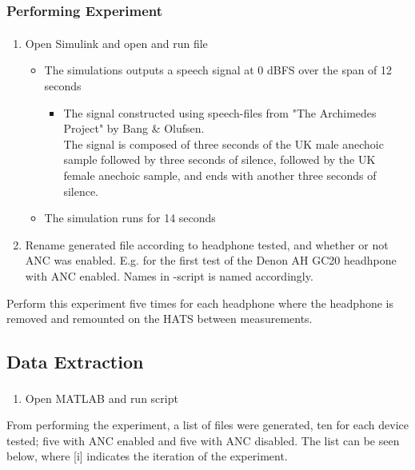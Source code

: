 	\subsubsection{Performing Experiment}
	\begin{enumerate}
		\item Open Simulink\textsuperscript{\textregistered} and open and run file 
		\begin{itemize} 
			\item The simulations outputs a speech signal at 0 dBFS over the span of 12 seconds
			\begin{itemize}
				\item [] The signal constructed using speech-files from "The Archimedes Project" by Bang \& Olufsen. \\
				The signal is composed of three seconds of the UK male anechoic sample followed by three seconds of silence, followed by the UK female anechoic sample, and ends with another three seconds of silence.
			\end{itemize}
			\item The simulation runs for 14 seconds
		\end{itemize}
		\item Rename generated file  according to headphone tested, and whether or not ANC was enabled. E.g.  for the first test of the Denon AH GC20 headhpone with ANC enabled. Names in -script is named accordingly.

	\end{enumerate}
	Perform this experiment five times for each headphone where the headphone is removed and remounted on the HATS between measurements. 
		
\subsection{Data Extraction}
\begin{enumerate}
	\item Open MATLAB\textsuperscript{\textregistered} and run script 
\end{enumerate}

From performing the experiment, a list of files were generated, ten for each device tested; five with ANC enabled and five with ANC disabled. The list can be seen below, where [i] indicates the iteration of the experiment.


